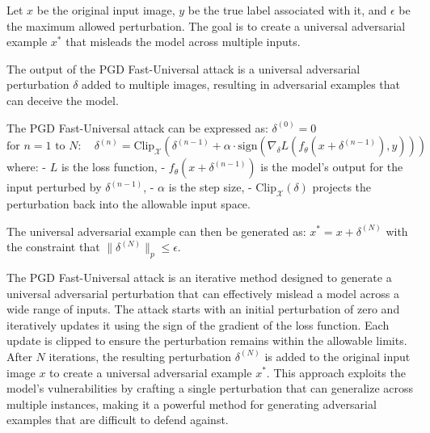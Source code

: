Let $x$ be the original input image, $y$ be the true label associated with it, and $\epsilon$ be the maximum allowed perturbation. The goal is to create a universal adversarial example $x^*$ that misleads the model across multiple inputs.

The output of the PGD Fast-Universal attack is a universal adversarial perturbation $\delta$ added to multiple images, resulting in adversarial examples that can deceive the model.

The PGD Fast-Universal attack can be expressed as:
$\delta^{(0)} = 0$
$\text{for } n = 1 \text{ to } N: \quad
\delta^{(n)} = \text{Clip}_{\mathcal{X}} \left( \delta^{(n-1)} + \alpha \cdot \text{sign} \left( \nabla_\delta L(f_\theta(x + \delta^{(n-1)}), y) \right) \right)$
where:
- $L$ is the loss function,
- $f_\theta(x + \delta^{(n-1)})$ is the model's output for the input perturbed by $\delta^{(n-1)}$,
- $\alpha$ is the step size,
- $\text{Clip}_{\mathcal{X}}(\delta)$ projects the perturbation back into the allowable input space.

The universal adversarial example can then be generated as:
$x^* = x + \delta^{(N)}$
with the constraint that $\|\delta^{(N)}\|_p \leq \epsilon$.

The PGD Fast-Universal attack is an iterative method designed to generate a universal adversarial perturbation that can effectively mislead a model across a wide range of inputs. The attack starts with an initial perturbation of zero and iteratively updates it using the sign of the gradient of the loss function. Each update is clipped to ensure the perturbation remains within the allowable limits. After $N$ iterations, the resulting perturbation $\delta^{(N)}$ is added to the original input image $x$ to create a universal adversarial example $x^*$. This approach exploits the model's vulnerabilities by crafting a single perturbation that can generalize across multiple instances, making it a powerful method for generating adversarial examples that are difficult to defend against.